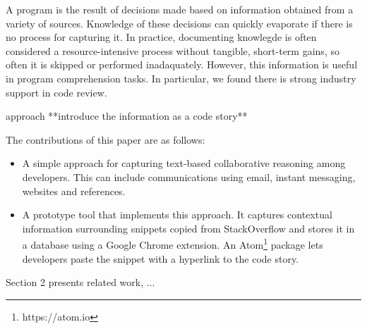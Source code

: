 \documentclass[../manifest.tex]{subfiles}
\begin{document}
A program is the result of decisions made based on information obtained from a
variety of sources. Knowledge of these decisions can quickly evaporate if there
is no process for capturing it. In practice, documenting knowlegde is often
considered a resource-intensive process without tangible, short-term gains, so
often it is skipped or performed inadaquately\cite{OZ:2008,NH:2007}. However,
this information is useful in program comprehension tasks. In particular, we found
there is strong industry support in  code
review.



approach  **introduce the information as a code story**

The contributions of this paper are as follows:
\begin{itemize}
  \item A simple approach for capturing text-based collaborative reasoning among
  developers. This can include communications using email, instant messaging,
  websites and references.
  \item A prototype tool that implements this approach. It captures contextual
  information surrounding snippets copied from StackOverflow and stores it in a
  database using a Google Chrome extension. An Atom\footnote{https://atom.io}
  package lets developers paste the snippet with a hyperlink to the code story.
\end{itemize}

Section 2 presents related work, ...

%
%
%
%
\end{document}
